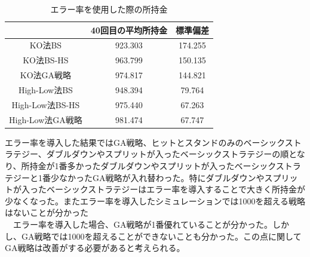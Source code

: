 \begin{table}[H]
 \caption{エラー率を使用した際の所持金\label{money-err}}
 \begin{center}
  \begin{tabular}{|c|c|c|}
  \hline  & 40回目の平均所持金 & 標準偏差 \\
  \hline KO法BS & 923.303 & 174.255\\
  \hline KO法BS-HS & 963.799 & 150.135 \\
  \hline KO法GA戦略 & 974.817 & 144.821\\
  \hline High-Low法BS & 948.394 & 79.764\\
  \hline High-Low法BS-HS  & 975.440 & 67.263\\
  \hline High-Low法GA戦略 & 981.474 & 67.747\\
  \hline
  \end{tabular}
 \end{center}
\end{table}
エラー率を導入した結果ではGA戦略、ヒットとスタンドのみのベーシックストラテジー、ダブルダウンやスプリットが入ったベーシックストラテジーの順となり、所持金が1番多かったダブルダウンやスプリットが入ったベーシックストラテジーと1番少なかったGA戦略が入れ替わった。特にダブルダウンやスプリットが入ったベーシックストラテジーはエラー率を導入することで大きく所持金が少なくなった。またエラー率を導入したシミュレーションでは1000を超える戦略はないことが分かった\\
　エラー率を導入した場合、GA戦略が1番優れていることが分かった。しかし、GA戦略では1000を超えることができないことも分かった。この点に関してGA戦略は改善がする必要があると考えられる。

